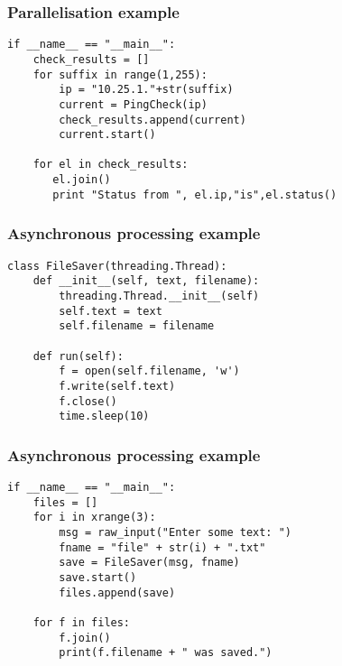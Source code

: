 \documentclass[10pt]{beamer}
\begin{document}
\begin{frame}[fragile]
	\frametitle{Parallelisation example}
\begin{Verbatim}[commandchars=\\\%\%]
if __name__ == "__main__":
    check_results = []
    for suffix in range(1,255):
        ip = "10.25.1."+str(suffix)
        current = PingCheck(ip)
        check_results.append(current)
        current.start()

    for el in check_results:
       el.join()
       print "Status from ", el.ip,"is",el.status()

\end{Verbatim}

\end{frame}
\begin{frame}[fragile]
	\frametitle{Asynchronous processing example}
\begin{Verbatim}[commandchars=\\\[\]]
class FileSaver(threading.Thread):
    def __init__(self, text, filename):
        threading.Thread.__init__(self)
        self.text = text
        self.filename = filename

    def run(self):
        f = open(self.filename, 'w')
        f.write(self.text)
        f.close()
        time.sleep(10)

\end{Verbatim}

\end{frame}
\begin{frame}[fragile]
	\frametitle{Asynchronous processing example}
\begin{Verbatim}[commandchars=\\\%\%]
if __name__ == "__main__":
    files = []
    for i in xrange(3):
        msg = raw_input("Enter some text: ")
        fname = "file" + str(i) + ".txt"
        save = FileSaver(msg, fname)
        save.start()
        files.append(save)

    for f in files:
        f.join()
        print(f.filename + " was saved.")

\end{Verbatim}

\end{frame}
\end{document}
